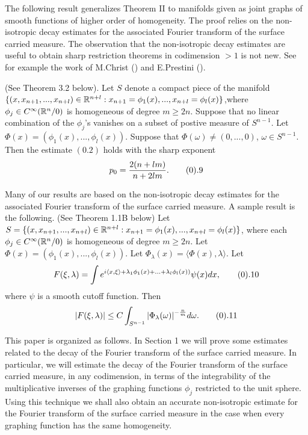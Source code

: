 The following result generalizes Theorem II to manifolds given as joint 
graphs of smooth functions of higher order of homogeneity. The proof relies
on the non-isotropic decay estimates for the associated Fourier transform
of the surface carried measure. The observation that the non-isotropic 
decay estimates are useful to obtain sharp restriction theorems in 
codimension $>1$ is not new. See for example the work of M.Christ (\cite{MC})
and E.Prestini (\cite{P}). 

 (See Theorem 3.2 below). 
Let $S$ denote a compact piece of the manifold 
$\{(x,x_{n+1},...,x_{n+l}) \in {\Bbb R}^{n+l}: 
x_{n+1}={\phi}_1(x),..., x_{n+l}={\phi}_l(x)\}$,where $\phi_j \in C^{\infty}
({\Bbb R}^n\slash 0)$
is homogeneous of degree $m \ge 2n$. Suppose that no linear combination 
of the  $\phi_j$'s  vanishes on a subset of postive measure of $S^{n-1}$.
Let ${\Phi}(x)= ({\phi}_1(x),..., {\phi}_l(x))$. 
Suppose that $\Phi(\omega)\not=(0,...,0)$, 
$\omega \in S^{n-1}$. 
Then the estimate $(0.2)$ holds with the 
sharp exponent 
$$p_0=\frac{2(n+lm)}{n+2lm}. \tag0.9$$  
\endproclaim  

Many of our results are based on the non-isotropic decay estimates for the
associated Fourier transform of the surface carried measure. A sample 
result is the following. 
 (See Theorem 1.1B below) 
Let $S=\{(x,x_{n+1},..., x_{n+l}) \in {\Bbb R}^{n+l}: 
x_{n+1}={\phi}_1(x), ..., x_{n+l}={\phi}_l(x)\}$, where each ${\phi}_j \in 
C^{\infty}({\Bbb R}^n\slash 0)$ is homogeneous of degree $m\ge2n$. 
Let ${\Phi}(x)=
({\phi}_1(x),..., {\phi}_l(x))$. Let 
${\Phi}_{\lambda}(x)=\langle \Phi(x), \lambda \rangle$. Let 
$$F(\xi,\lambda)=\int e^{i\langle x,\xi \rangle +{\lambda}_1{\phi}_1(x)+...+
{\lambda}_l {\phi}_l(x))} \psi(x)dx, \tag0.10$$ where $\psi$ is a smooth
cutoff function. Then  
$$ |F(\xi,\lambda)| \leq C\int_{S^{n-1}} 
{|{\Phi}_{\lambda}(\omega)|}^{-\frac{n}{m}} d\omega. \tag0.11$$  
\endproclaim

This paper is organized as follows. In Section 1 we will prove some estimates
related to the decay of the Fourier transform of the surface carried measure. In
particular, we will estimate the decay of the Fourier transform of the surface
carried measure, in any codimension, in terms of the integrability of the  
multiplicative inverses of the graphing functions ${\phi}_j$ restricted to the 
unit sphere. Using this technique we shall also obtain an accurate non-isotropic
estimate for the Fourier transform of the surface carried measure in the case 
when every graphing function has the same homogeneity. 

